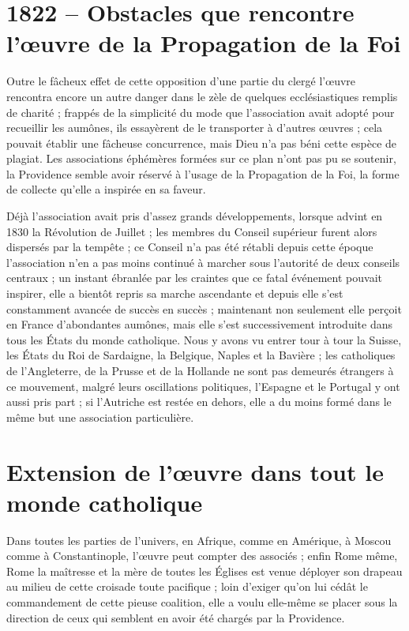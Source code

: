 \documentclass[11pt,a4paper]{report}
\begin{document}
\section*{1822 -- Obstacles que rencontre l'œuvre de la Propagation de la Foi}

Outre le fâcheux effet de cette opposition d'une partie du clergé l'œuvre rencontra encore un autre danger dans le zèle de quelques ecclésiastiques remplis de charité ; frappés de la simplicité du mode que l'association avait adopté pour recueillir les aumônes, ils essayèrent de le transporter à d'autres œuvres ; cela pouvait établir une fâcheuse concurrence, mais Dieu n'a pas béni cette espèce de plagiat. Les associations éphémères formées sur ce plan n'ont pas pu se soutenir, la Providence semble avoir réservé à l'usage de la Propagation de la Foi, la forme de collecte qu'elle a inspirée en sa faveur.

Déjà l'association avait pris d'assez grands développements, lorsque advint en 1830 la Révolution de Juillet ; les membres du Conseil supérieur furent alors dispersés par la tempête ; ce Conseil n'a pas été rétabli depuis cette époque l'association n'en a pas moins continué à marcher sous l'autorité de deux conseils centraux ; un instant ébranlée par les craintes que ce fatal événement pouvait inspirer, elle a bientôt repris sa marche ascendante et depuis elle s'est constamment avancée de succès en succès ; maintenant non seulement elle perçoit en France d'abondantes aumônes, mais elle s'est successivement introduite dans tous les États du monde catholique. Nous y avons vu entrer tour à tour la Suisse, les États du Roi de Sardaigne, la Belgique, Naples et la Bavière ; les catholiques de l'Angleterre, de la Prusse et de la Hollande ne sont pas demeurés étrangers à ce mouvement, malgré leurs oscillations politiques, l'Espagne et le Portugal y ont aussi pris part ; si l'Autriche est restée en dehors, elle a du moins formé dans le même but une association particulière.

\section*{Extension de l'œuvre dans tout le monde catholique}

Dans toutes les parties de l'univers, en Afrique, comme en Amérique, à Moscou comme à Constantinople, l'œuvre peut compter des associés ; enfin Rome même, Rome la maîtresse et la mère de toutes les Églises est venue déployer son drapeau au milieu de cette croisade toute pacifique ; loin d'exiger qu'on lui cédât le commandement de cette pieuse coalition, elle a voulu elle-même se placer sous la direction de ceux qui semblent en avoir été chargés par la Providence.
\end{document}

